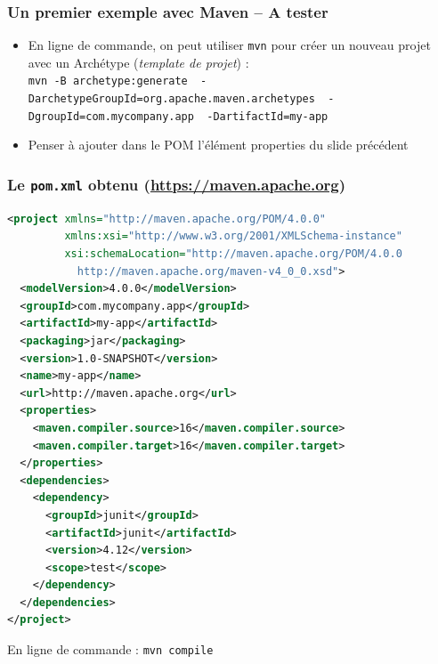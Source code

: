 \documentclass{beamer}
\begin{document}
\begin{frame}[fragile]
  \frametitle{Un premier exemple avec Maven -- A tester}
\begin{itemize}
\item En ligne de commande, on peut utiliser \texttt{mvn} pour créer
  un nouveau projet avec un Archétype (\textit{template de projet}) :\\
 \texttt{mvn -B archetype:generate \ 
  -DarchetypeGroupId=org.apache.maven.archetypes \
  -DgroupId=com.mycompany.app \
  -DartifactId=my-app}
\item Penser à ajouter dans le POM l'élément properties du slide
  précédent
\end{itemize}  
\end{frame}

\begin{frame}[fragile]
  \frametitle{Le \texttt{pom.xml} obtenu {\normalsize (\url{https://maven.apache.org})}}
\begin{lstlisting}[language=XML,basicstyle=\tiny]
<project xmlns="http://maven.apache.org/POM/4.0.0"
         xmlns:xsi="http://www.w3.org/2001/XMLSchema-instance"
         xsi:schemaLocation="http://maven.apache.org/POM/4.0.0
           http://maven.apache.org/maven-v4_0_0.xsd">
  <modelVersion>4.0.0</modelVersion>
  <groupId>com.mycompany.app</groupId>
  <artifactId>my-app</artifactId>
  <packaging>jar</packaging>
  <version>1.0-SNAPSHOT</version>
  <name>my-app</name>
  <url>http://maven.apache.org</url>
  <properties>
    <maven.compiler.source>16</maven.compiler.source>
    <maven.compiler.target>16</maven.compiler.target>
  </properties>
  <dependencies>
    <dependency>
      <groupId>junit</groupId>
      <artifactId>junit</artifactId>
      <version>4.12</version>
      <scope>test</scope>
    </dependency>
  </dependencies>
</project>
\end{lstlisting}
En ligne de commande : \texttt{mvn compile}
\end{frame}
\end{document}
